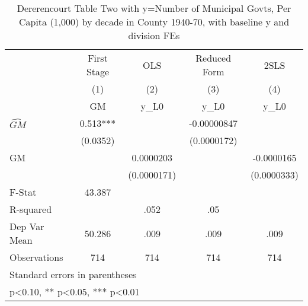\begin{table}[htbp]\centering
\def\sym#1{\ifmmode^{#1}\else\(^{#1}\)\fi}
\caption{Dererencourt Table Two with y=Number of Municipal Govts, Per Capita (1,000) by decade in County 1940-70, with baseline y and division FEs}
\begin{tabular}{l*{4}{c}}
\toprule
                    & First Stage   &         OLS   &Reduced Form   &        2SLS   \\
                    &\multicolumn{1}{c}{(1)}&\multicolumn{1}{c}{(2)}&\multicolumn{1}{c}{(3)}&\multicolumn{1}{c}{(4)}\\
                    &\multicolumn{1}{c}{GM}&\multicolumn{1}{c}{y\_L0}&\multicolumn{1}{c}{y\_L0}&\multicolumn{1}{c}{y\_L0}\\
\midrule
$\hat{GM}$          &       0.513***&               & -0.00000847   &               \\
                    &    (0.0352)   &               & (0.0000172)   &               \\
\addlinespace
GM                  &               &   0.0000203   &               &  -0.0000165   \\
                    &               & (0.0000171)   &               & (0.0000333)   \\
\midrule
F-Stat              &      43.387   &               &               &               \\
R-squared           &               &        .052   &         .05   &               \\
Dep Var Mean        &      50.286   &        .009   &        .009   &        .009   \\
Observations        &         714   &         714   &         714   &         714   \\
\bottomrule
\multicolumn{5}{l}{\footnotesize Standard errors in parentheses}\\
\multicolumn{5}{l}{\footnotesize * p<0.10, ** p<0.05, *** p<0.01}\\
\end{tabular}
\end{table}
